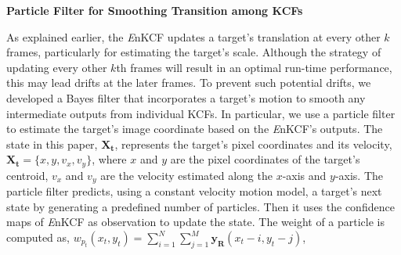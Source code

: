 \documentclass[10pt,twocolumn,letterpaper]{article}
\begin{document}
\textbf{Particle Filter for Smoothing Transition among KCFs}

As explained earlier, the {\it E}nKCF updates a target's translation
at every other $k$ frames, particularly for estimating the target's
scale. Although the strategy of updating every other $k$th frames will
result in an optimal run-time performance, this may lead drifts at the
later frames. To prevent such potential drifts, we developed a Bayes
filter that incorporates a target's motion to smooth any intermediate
outputs from individual KCFs. In particular, we use a particle filter
to estimate the target's image coordinate based on the {\it E}nKCF's
outputs. The state in this paper, $\mathbf{X_t}$, represents the target's pixel
coordinates and its velocity, $\mathbf{X_t} = \lbrace x, y, v_{x}, v_{y}
\rbrace$, where $x$ and $y$ are the pixel coordinates of the target's
centroid, $v_x$ and $v_y$ are the velocity estimated along the
$x$-axis and $y$-axis. The particle filter predicts, using a constant
velocity motion model, a target's next state by generating a predefined
number of particles. Then it uses the confidence maps of {\it E}nKCF
as observation to update the state. The weight of a particle is
computed as, $w_{p_{t}}(x_{t},y_{t}) = \sum_{i=1}^{N}\sum_{j=1}^{M} \mathbf{y_{R}}(x_{t}-i,y_{t}-j)$,
\end{document}
